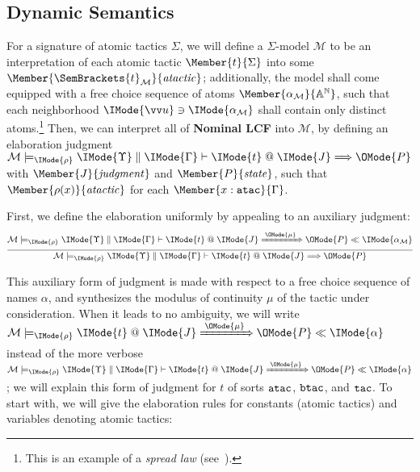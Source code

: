 \subsection{Dynamic Semantics}
\newcommand\LCFElab[5]{%
  \mathcal{M}\models_\IMode{\rho}
  \IMode{#1}\parallel\IMode{#2}\vdash%
  \IMode{#3}\;@\;\IMode{#4}\Longrightarrow\OMode{#5}%
}

\newcommand\LCFElabSt[7]{%
  \mathcal{M}\models_\IMode{\rho}%
  \IMode{#3}\;@\; \IMode{#4}\xRightarrow{\;\OMode{#7}\;}\OMode{#5}%
  \ll\IMode{#6}
}

\newcommand\LCFElabStVerbose[7]{%
  \mathcal{M}\models_\IMode{\rho}%
  \IMode{#1}\parallel\IMode{#2}\vdash%
  \IMode{#3}\;@\; \IMode{#4}\xRightarrow{\;\OMode{#7}\;}\OMode{#5}%
  \ll\IMode{#6}
}


For a signature of atomic tactics $\Sigma$, we will define a $\Sigma$-model
$\mathcal{M}$ to be an interpretation of each atomic tactic
$\Member{t}{\Sigma}$ into some
$\Member{\SemBrackets{t}_\mathcal{M}}{\LCFAtomicTactic}$; additionally, the
model shall come equipped with a free choice sequence of atoms
$\Member{\alpha_\mathcal{M}}{\MLStream{\MLAtom}}$, such that each neighborhood
$\IMode{\vec{u}}\ni\IMode{\alpha_\mathcal{M}}$ shall contain only distinct
atoms.\footnote{This is an example of a \emph{spread law}
(see~\cite{brouwer:1981}).} Then, we can interpret all of \textbf{Nominal LCF}
into $\mathcal{M}$, by defining an elaboration judgment
$\LCFElab{\Upsilon}{\Gamma}{t}{J}{P}$ with
$\Member{J}{\LCFJudgment}$ and
$\Member{P}{\LCFState}$,
such that $\Member{\rho(x)}{\LCFAtomicTactic}$ for each
$\Member{x:\SortATac}{\Gamma}$.

First, we define the elaboration uniformly by appealing to an auxiliary judgment:
\[
  \infer{
    \LCFElab{\Upsilon}{\Gamma}{t}{J}{P}
  }{
    \LCFElabStVerbose{\Upsilon}{\Gamma}{t}{J}{P}{\alpha_\mathcal{M}}{\mu}
  }
\]

This auxiliary form of judgment is made with respect to a free choice sequence
of names $\alpha$, and synthesizes the modulus of continuity $\mu$ of
the tactic under consideration.  When it leads to no ambiguity, we will write
$\LCFElabSt{\Upsilon}{\Gamma}{t}{J}{P}{\alpha}{\mu}$ instead of the
more verbose
$\LCFElabStVerbose{\Upsilon}{\Gamma}{t}{J}{P}{\alpha}{\mu}$; we will
explain this form of judgment for $t$ of sorts $\mathtt{atac}$, $\mathtt{btac}$, and
$\mathtt{tac}$. To start with, we will give the elaboration rules for constants
(atomic tactics) and variables denoting atomic tactics:

